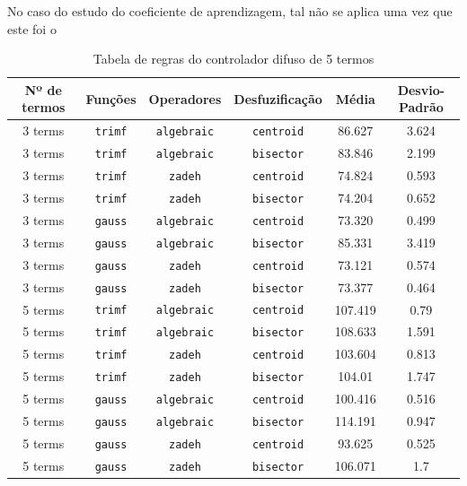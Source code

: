 \documentclass{article}
\begin{document}
No caso do estudo do coeficiente de aprendizagem, tal não se aplica uma vez que este foi o 
\begin{table}[!h]
\centering
	\caption{Tabela de regras do controlador difuso de 5 termos}
	\label{results}
	\begin{tabular}{|c|c|c|c|c|c|}
		\hline 
		\textbf{Nº de termos} & \textbf{Funções} & \textbf{Operadores} & \textbf{Desfuzificação} & \textbf{Média} & \textbf{Desvio-Padrão} \\
		\hline
		3 terms & \texttt{trimf} & \texttt{algebraic} & \texttt{centroid} & 86.627 & 3.624 \\
		\hline
		3 terms & \texttt{trimf} & \texttt{algebraic} & \texttt{bisector} & 83.846 & 2.199 \\
		\hline
		3 terms & \texttt{trimf} & \texttt{zadeh} & \texttt{centroid} & 74.824 & 0.593 \\
		\hline
		3 terms & \texttt{trimf} & \texttt{zadeh} & \texttt{bisector} & 74.204 & 0.652 \\
		\hline
		3 terms & \texttt{gauss} & \texttt{algebraic} & \texttt{centroid} & 73.320 & 0.499 \\
		\hline
		3 terms & \texttt{gauss} & \texttt{algebraic} & \texttt{bisector} & 85.331 & 3.419 \\
		\hline
		3 terms & \texttt{gauss} & \texttt{zadeh} & \texttt{centroid} & 73.121 & 0.574 \\
		\hline
		3 terms & \texttt{gauss} & \texttt{zadeh} & \texttt{bisector} & 73.377 & 0.464 \\
		\hline
		5 terms & \texttt{trimf} & \texttt{algebraic} & \texttt{centroid} & 107.419 & 0.79 \\
		\hline
		5 terms & \texttt{trimf} & \texttt{algebraic} & \texttt{bisector} & 108.633 & 1.591 \\
		\hline
		5 terms & \texttt{trimf} & \texttt{zadeh} & \texttt{centroid} & 103.604 & 0.813 \\
		\hline
		5 terms & \texttt{trimf} & \texttt{zadeh} & \texttt{bisector} & 104.01 & 1.747 \\
		\hline
		5 terms & \texttt{gauss} & \texttt{algebraic} & \texttt{centroid} & 100.416 & 0.516 \\
		\hline
		5 terms & \texttt{gauss} & \texttt{algebraic} & \texttt{bisector} & 114.191 & 0.947 \\
		\hline
		5 terms & \texttt{gauss} & \texttt{zadeh} & \texttt{centroid} & 93.625 & 0.525 \\
		\hline
		5 terms & \texttt{gauss} & \texttt{zadeh} & \texttt{bisector} & 106.071 & 1.7 \\
		\hline
	\end{tabular} 
\end{table}
\end{document}
